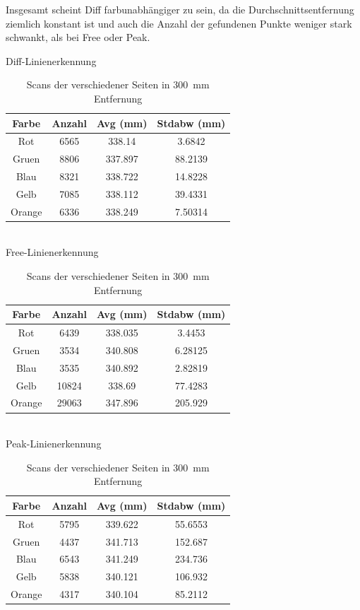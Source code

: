 \documentclass[ngerman,a4paper,parskip=half]{scrartcl}
\begin{document}
Insgesamt scheint Diff farbunabhängiger zu sein, da die Durchschnittsentfernung ziemlich konstant ist und auch die Anzahl der gefundenen Punkte weniger stark schwankt, als bei Free oder Peak. 


\begin{table}[H]
	\centering
	Diff-Linienerkennung \\
	\begin{tabular}{c|c|c|c}
		Farbe & Anzahl & Avg (mm) & Stdabw (mm) \\ \hline
		Rot & 6565 & 338.14 & 3.6842 \\
		Gruen & 8806 & 337.897 & 88.2139 \\
		Blau & 8321 & 338.722 & 14.8228 \\
		Gelb & 7085 & 338.112 & 39.4331 \\
		Orange & 6336 & 338.249 & 7.50314 \\
	\end{tabular} \\
	\vspace{1em}
	Free-Linienerkennung \\
		\begin{tabular}{c|c|c|c}
		Farbe & Anzahl & Avg (mm) & Stdabw (mm) \\ \hline
		Rot & 6439 & 338.035 & 3.4453 \\
		Gruen & 3534 & 340.808 & 6.28125 \\
		Blau & 3535 & 340.892 & 2.82819 \\
		Gelb & 10824 & 338.69 & 77.4283 \\
		Orange & 29063 & 347.896 & 205.929 \\
	\end{tabular} \\
	\vspace{1em}
	Peak-Linienerkennung \\
		\begin{tabular}{c|c|c|c}
		Farbe & Anzahl & Avg (mm) & Stdabw (mm) \\ \hline
		Rot & 5795 & 339.622 & 55.6553 \\
		Gruen & 4437 & 341.713 & 152.687 \\
		Blau & 6543 & 341.249 & 234.736 \\
		Gelb & 5838 & 340.121 & 106.932 \\
		Orange & 4317 & 340.104 & 85.2112 \\
	\end{tabular} \
	\caption{Scans der verschiedener Seiten in 300~mm Entfernung}
	\label{tab:colors}
\end{table}
\end{document}

